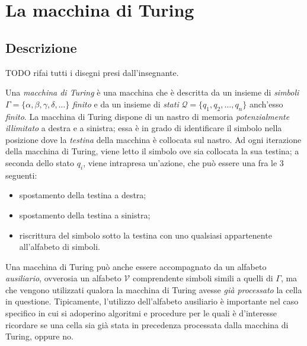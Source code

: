 \documentclass[10pt]{book}
\begin{document}
\setmonofont[Scale=.85]{Fira Code Retina}




\tableofcontents

\chapter{La macchina di Turing}
\section{Descrizione}
TODO rifai tutti i disegni presi dall'insegnante.

Una \emph{macchina di Turing} è una macchina che è descritta da un insieme di
\emph{simboli} $\Gamma = \{\alpha, \beta, \gamma, \delta, \dots\}$ \emph{finito} e da
un insieme di \emph{stati} $\mathcal{Q} = \{q_1, q_2, \dots, q_n\}$ anch'esso
\emph{finito}. La macchina di Turing dispone di un nastro di memoria \emph{potenzialmente
illimitato} a destra e a sinistra; essa è in grado di identificare il simbolo
nella posizione dove la \emph{testina} della macchina è collocata sul nastro.
Ad ogni iterazione della macchina di Turing, viene letto il simbolo
ove sia collocata la sua testina; a seconda dello stato $q_i$, viene intrapresa
un'azione, che può essere una fra le $3$ seguenti:
\begin{itemize}
    \item spostamento della testina a destra;
    \item spostamento della testina a sinistra;
    \item riscrittura del simbolo sotto la testina con uno qualsiasi
        appartenente all'alfabeto di simboli.
\end{itemize}

Una macchina di Turing può anche essere accompagnato da un alfabeto
\emph{ausiliario}, ovverosia un alfabeto $\mathcal V$ comprendente simboli
simili a quelli di $\Gamma$, ma che vengono utilizzati qualora la macchina di
Turing avesse \emph{già processato} la cella in questione. Tipicamente,
l'utilizzo dell'alfabeto ausiliario è importante nel caso specifico in cui si
adoperino algoritmi e procedure per le quali è d'interesse ricordare se una
cella sia già stata in precedenza processata dalla macchina di Turing, oppure
no.
\end{document}
